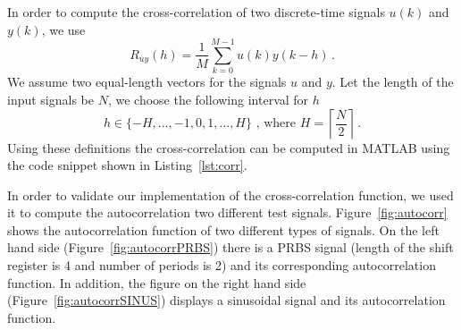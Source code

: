 \documentclass{scrartcl}
\newcommand{\matlabcode}[3]{\begin{figure}[h]\end{figure}}
\begin{document}
In order to compute the cross-correlation of two discrete-time signals $u(k)$ and $y(k)$, we use 
\begin{equation}
	R_{uy}(h) = \frac{1}{M} \sum\limits_{k=0}^{M-1} u(k)y(k-h)\, .
\end{equation}
We assume two equal-length vectors for the signals $u$ and $y$. Let the length of the input signals be $N$, we choose the following interval for $h$
\begin{equation}
	h \in \{-H, \dots, -1, 0, 1, \dots, H\}\text{ , where } H = \left\lceil \frac{N}{2} \right\rceil \, .
\end{equation}
Using these definitions the cross-correlation can be computed in MATLAB using the code snippet shown in Listing~\ref{lst:corr}.

\matlabcode{../matlab/ce1/intcor.m}{Computing a discrete-time cross correlation of the signal u and y in matlab}{lst:corr}

In order to validate our implementation of the cross-correlation function, we used it to compute the autocorrelation two different test signals. 
Figure~\ref{fig:autocorr} shows the autocorrelation function of two different types of signals. 
On the left hand side (Figure~\ref{fig:autocorrPRBS}) there is a PRBS signal (length of the shift register is 4 and number of periods is 2) and its corresponding autocorrelation function. 
In addition, the figure on the right hand side (Figure~\ref{fig:autocorrSINUS}) displays a sinusoidal signal and its autocorrelation function.  
\end{document}
